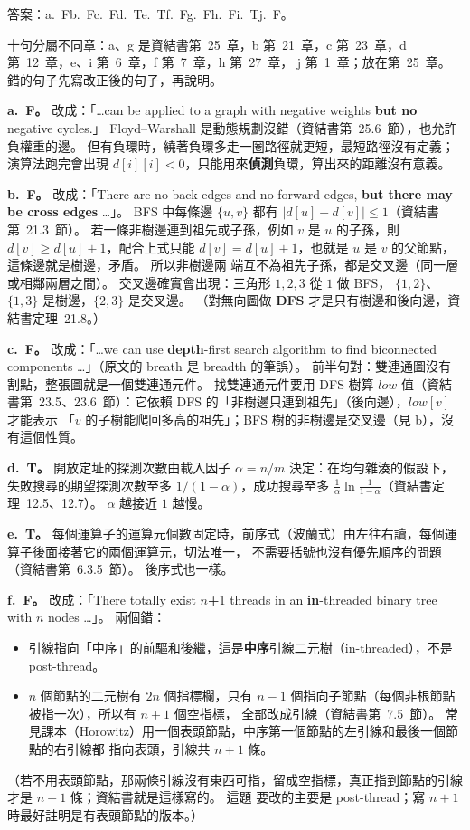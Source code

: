 \begin{pastsoln}
答案：a.~F\quad b.~F\quad c.~F\quad d.~T\quad e.~T\quad f.~F\quad g.~F\quad h.~F\quad i.~T\quad j.~F。

十句分屬不同章：a、g 是資結書第~25~章，b 第~21~章，c 第~23~章，d 第~12~章，e、i 第~6~章，f 第~7~章，h 第~27~章，
j 第~1~章；放在第~25~章。 錯的句子先寫改正後的句子，再說明。

\textbf{a.~F。} 改成：「\ldots can be applied to a graph with negative weights \textbf{but no} negative cycles.」 Floyd--Warshall
是動態規劃沒錯（資結書第~25.6~節），也允許負權重的邊。 但有負環時，繞著負環多走一圈路徑就更短，最短路徑沒有定義；
演算法跑完會出現 $d[i][i] < 0$，只能用來\textbf{偵測}負環，算出來的距離沒有意義。

\textbf{b.~F。} 改成：「There are no back edges and no forward edges, \textbf{but there may be cross edges} \ldots」。 BFS 中每條邊
$\{u, v\}$ 都有 $|d[u] - d[v]| \le 1$（資結書第~21.3~節）。 若一條非樹邊連到祖先或子孫，例如 $v$ 是 $u$ 的子孫，則
$d[v] \ge d[u] + 1$，配合上式只能 $d[v] = d[u] + 1$，也就是 $u$ 是 $v$ 的父節點，這條邊就是樹邊，矛盾。 所以非樹邊兩
端互不為祖先子孫，都是交叉邊（同一層或相鄰兩層之間）。 交叉邊確實會出現：三角形 $1, 2, 3$ 從 $1$ 做 BFS，
$\{1,2\}$、$\{1,3\}$ 是樹邊，$\{2,3\}$ 是交叉邊。 （對無向圖做 \textbf{DFS} 才是只有樹邊和後向邊，資結書定理~21.8。）

\textbf{c.~F。} 改成：「\ldots we can use \textbf{depth}-first search algorithm to find biconnected components \ldots」（原文的 breath
是 breadth 的筆誤）。 前半句對：雙連通圖沒有割點，整張圖就是一個雙連通元件。 找雙連通元件要用 DFS 樹算
$\mathit{low}$ 值（資結書第~23.5、23.6~節）：它依賴 DFS 的「非樹邊只連到祖先」（後向邊），$\mathit{low}[v]$ 才能表示
「$v$ 的子樹能爬回多高的祖先」；BFS 樹的非樹邊是交叉邊（見 b），沒有這個性質。

\textbf{d.~T。} 開放定址的探測次數由載入因子 $\alpha = n/m$ 決定：在均勻雜湊的假設下，失敗搜尋的期望探測次數至多
$1/(1 - \alpha)$，成功搜尋至多 $\frac{1}{\alpha}\ln\frac{1}{1-\alpha}$（資結書定理~12.5、12.7）。 $\alpha$ 越接近 $1$ 越慢。

\textbf{e.~T。} 每個運算子的運算元個數固定時，前序式（波蘭式）由左往右讀，每個運算子後面接著它的兩個運算元，切法唯一，
不需要括號也沒有優先順序的問題（資結書第~6.3.5~節）。 後序式也一樣。

\textbf{f.~F。} 改成：「There totally exist $n$\textbf{+}1 threads in an \textbf{in}-threaded binary tree with $n$ nodes \ldots」。 兩個錯：
\begin{itemize}
\item 引線指向「中序」的前驅和後繼，這是\textbf{中序}引線二元樹（in-threaded），不是 post-thread。
\item $n$ 個節點的二元樹有 $2n$ 個指標欄，只有 $n - 1$ 個指向子節點（每個非根節點被指一次），所以有 $n + 1$ 個空指標，
全部改成引線（資結書第~7.5~節）。 常見課本（Horowitz）用一個表頭節點，中序第一個節點的左引線和最後一個節點的右引線都
指向表頭，引線共 $n + 1$ 條。
\end{itemize}
（若不用表頭節點，那兩條引線沒有東西可指，留成空指標，真正指到節點的引線才是 $n - 1$ 條；資結書就是這樣寫的。 這題
要改的主要是 post-thread；寫 $n + 1$ 時最好註明是有表頭節點的版本。）


\end{pastsoln}
